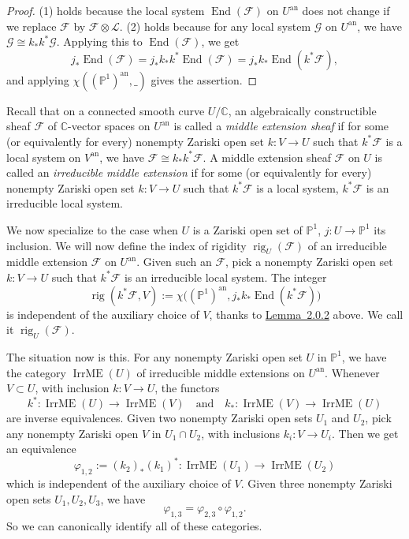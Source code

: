\begin{proof}
(1) holds because the local system \(\operatorname{End}(\mathcal{F})\) on
\(U^{\mathrm{an}}\) does not change if we replace \(\mathcal{F}\) by
\(\mathcal{F}\otimes\mathcal{L}\). (2) holds because for any local system
\(\mathcal{G}\) on \(U^{\mathrm{an}}\), we have
\(\mathcal{G}\cong k_*k^*\mathcal{G}\). Applying this to
\(\operatorname{End}(\mathcal{F})\), we get
\[
  j_*\operatorname{End}(\mathcal{F})
  =j_*k_*k^*\operatorname{End}(\mathcal{F})
  =j_*k_*\operatorname{End}(k^*\mathcal{F}),
\]
and applying \(\chi((\mathbb{P}^1)^{\mathrm{an}},\_)\) gives the assertion.
\end{proof}

Recall \cite[7.3.1]{Ka-ESDE} that on a connected smooth curve
\(U/\mathbb{C}\), an algebraically constructible sheaf \(\mathcal{F}\) of
\(\mathbb{C}\)-vector spaces on \(U^{\mathrm{an}}\) is called a
\emph{middle extension sheaf} if for some (or equivalently for every) nonempty
Zariski open set \(k:V\to U\) such that \(k^*\mathcal{F}\) is a local system on
\(V^{\mathrm{an}}\), we have \(\mathcal{F}\cong k_*k^*\mathcal{F}\). A middle
extension sheaf \(\mathcal{F}\) on \(U\) is called an \emph{irreducible middle
extension} if for some (or equivalently for every) nonempty Zariski open set
\(k:V\to U\) such that \(k^*\mathcal{F}\) is a local system,
\(k^*\mathcal{F}\) is an irreducible local system.

We now specialize to the case when \(U\) is a Zariski open set of
\(\mathbb{P}^1\), \(j:U\to\mathbb{P}^1\) its inclusion. We will now define the
index of rigidity \(\operatorname{rig}_U(\mathcal{F})\) of an irreducible
middle extension \(\mathcal{F}\) on \(U^{\mathrm{an}}\). Given such an
\(\mathcal{F}\), pick a nonempty Zariski open set \(k:V\to U\) such that
\(k^*\mathcal{F}\) is an irreducible local system. The integer
\[
  \operatorname{rig}(k^*\mathcal{F},V):=
  \chi\bigl((\mathbb{P}^1)^{\mathrm{an}},
  j_*k_*\operatorname{End}(k^*\mathcal{F})\bigr)
\]
is independent of the auxiliary choice of \(V\), thanks to
\hyperref[lem:2.0.2]{Lemma~2.0.2} above. We call it
\(\operatorname{rig}_U(\mathcal{F})\).

The situation now is this. For any nonempty Zariski open set \(U\) in
\(\mathbb{P}^1\), we have the category \(\operatorname{IrrME}(U)\) of
irreducible middle extensions on \(U^{\mathrm{an}}\). Whenever \(V\subset U\),
with inclusion \(k:V\to U\), the functors
\[
  k^*:\operatorname{IrrME}(U)\to\operatorname{IrrME}(V)
  \quad\text{and}\quad
  k_*:\operatorname{IrrME}(V)\to\operatorname{IrrME}(U)
\]
are inverse equivalences. Given two nonempty Zariski open sets \(U_1\) and
\(U_2\), pick any nonempty Zariski open \(V\) in \(U_1\cap U_2\), with
inclusions \(k_i:V\to U_i\). Then we get an equivalence
\[
  \varphi_{1,2}:=(k_2)_*(k_1)^*:
  \operatorname{IrrME}(U_1)\to\operatorname{IrrME}(U_2)
\]
which is independent of the auxiliary choice of \(V\). Given three nonempty
Zariski open sets \(U_1,U_2,U_3\), we have
\[
  \varphi_{1,3}=\varphi_{2,3}\circ\varphi_{1,2}.
\]
So we can canonically identify all of these categories.

